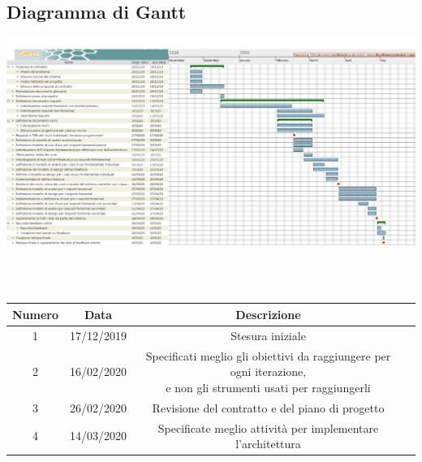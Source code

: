 \subsection{Diagramma di Gantt}
\vspace{0.5cm}
\begin{center}
	\hspace*{-2cm}\includegraphics[width=16cm]{../Contents/Diagrams/Gantt_Chart/Gantt_NexiFy.png}
\end{center}
\vspace{2cm}

\clearpage
{} \\ \\
\begin{tabular}{|c | c | c | c|} 
 	\hline
	 Numero & Data & Descrizione \\ [0.5ex] 
	\hline\hline
	1 & 17/12/2019 & Stesura iniziale \\ 
	\hline
	2 & 16/02/2020 & \thead{Specificati meglio gli obiettivi da raggiungere per ogni iterazione,\\e non gli strumenti usati per raggiungerli} \\ 
	\hline
	3 & 26/02/2020 & Revisione del contratto e del piano di progetto \\ 
	\hline
	4 & 14/03/2020 & Specificate meglio attività per implementare l'architettura\\
	\hline
\end{tabular}